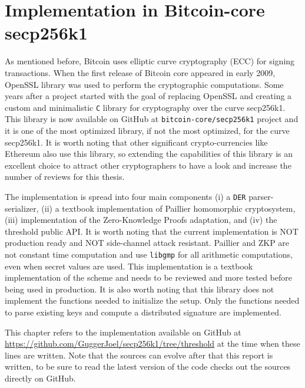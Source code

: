 \chapter{Implementation in Bitcoin-core secp256k1}
\label{chap:implementation-secp256k1}

As mentioned before, Bitcoin uses elliptic curve cryptography (ECC) for signing
transactions. When the first release of Bitcoin core appeared in early 2009,
OpenSSL library was used to perform the cryptographic computations. Some years
after a project started with the goal of replacing OpenSSL and creating a custom
and minimalistic \texttt{C} library for cryptography over the curve secp256k1.
This library is now available on GitHub at \texttt{bitcoin-core/secp256k1}
project and it is one of the most optimized library, if not the most optimized,
for the curve secp256k1. It is worth noting that other significant
crypto-currencies like Ethereum also use this library, so extending the
capabilities of this library is an excellent choice to attract other
cryptographers to have a look and increase the number of reviews for this
thesis.

The implementation is spread into four main components (i) a \texttt{DER}
parser-serializer, (ii) a textbook implementation of Paillier homomorphic
cryptosystem, (iii) implementation of the Zero-Knowledge Proofs adaptation, and
(iv) the threshold public API. It is worth noting that the current
implementation is NOT production ready and NOT side-channel attack resistant.
Paillier and ZKP are not constant time computation and use \texttt{libgmp} for
all arithmetic computations, even when secret values are used. This
implementation is a textbook implementation of the scheme and needs to be
reviewed and more tested before being used in production. It is also worth
noting that this library does not implement the functions needed to initialize
the setup. Only the functions needed to parse existing keys and compute a
distributed signature are implemented.

This chapter refers to the implementation available on GitHub at
\url{https://github.com/GuggerJoel/secp256k1/tree/threshold} at the time when
these lines are written. Note that the sources can evolve after that this report
is written, to be sure to read the latest version of the code checks out the
sources directly on GitHub.

\minitoc

\newpage

